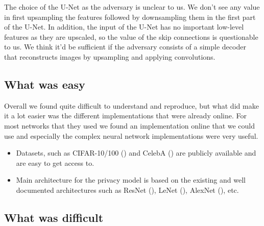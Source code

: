 The choice of the U-Net as the adversary is unclear to us. We don't see any value in first upsampling the features followed by downsampling them in the first part of the U-Net. In addition, the input of the U-Net has no important low-level features as they are upscaled, so the value of the skip connections is questionable to us. We think it'd be sufficient if the adversary consists of a simple decoder that reconstructs images by upsampling and applying convolutions.

\newpage
\subsection{What was easy}


Overall we found \citet{xiang2020interpretable} quite difficult to understand and reproduce, but what did make it a lot easier was the different implementations that were already online. For most networks that they used we found an implementation online that we could use and especially the complex neural network implementations were very useful. 

\begin{itemize}
    \item Datasets, such as CIFAR-10/100 (\citet{cifar10-cifar100}) and CelebA (\citet{CelebA}) are publicly available and are easy to get access to.
    \item Main architecture for the privacy model is based on the existing and well documented architectures such as ResNet (\citet{DBLP:journals/corr/HeZRS15}), LeNet (\citet{lecun1998gradient}), AlexNet (\citet{AlexNet}), etc.
\end{itemize}

\subsection{What was difficult}

